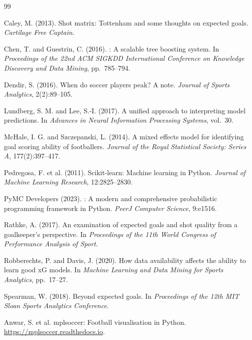 \documentclass[12pt,a4paper]{article}
\begin{document}

\begin{thebibliography}{99}

Caley, M. (2013).
\newblock Shot matrix: {Tottenham} and some thoughts on expected goals.
\newblock \emph{Cartilage Free Captain}.

Chen, T. and Guestrin, C. (2016).
: A scalable tree boosting system.
\newblock In \emph{Proceedings of the 22nd ACM SIGKDD International Conference on Knowledge Discovery and Data Mining}, pp.\ 785--794.

Dendir, S. (2016).
\newblock When do soccer players peak? A note.
\newblock \emph{Journal of Sports Analytics}, 2(2):89--105.

Lundberg, S. M. and Lee, S.-I. (2017).
\newblock A unified approach to interpreting model predictions.
\newblock In \emph{Advances in Neural Information Processing Systems}, vol.\ 30.

McHale, I. G. and Szczepanski, L. (2014).
\newblock A mixed effects model for identifying goal scoring ability of footballers.
\newblock \emph{Journal of the Royal Statistical Society: Series A}, 177(2):397--417.

Pedregosa, F. et al. (2011).
\newblock Scikit-learn: Machine learning in {Python}.
\newblock \emph{Journal of Machine Learning Research}, 12:2825--2830.

{PyMC Developers} (2023).
: A modern and comprehensive probabilistic programming framework in {Python}.
\newblock \emph{PeerJ Computer Science}, 9:e1516.

Rathke, A. (2017).
\newblock An examination of expected goals and shot quality from a goalkeeper's perspective.
\newblock In \emph{Proceedings of the 11th World Congress of Performance Analysis of Sport}.

Robberechts, P. and Davis, J. (2020).
\newblock How data availability affects the ability to learn good {xG} models.
\newblock In \emph{Machine Learning and Data Mining for Sports Analytics}, pp.\ 17--27.

Spearman, W. (2018).
\newblock Beyond expected goals.
\newblock In \emph{Proceedings of the 12th MIT Sloan Sports Analytics Conference}.

Anwar, S. et al.
\newblock mplsoccer: Football visualisation in {Python}.
\newblock \url{https://mplsoccer.readthedocs.io}.

\end{thebibliography}
\end{document}
